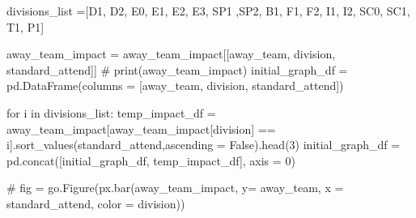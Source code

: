 \documentclass[
  letterpaper,
  DIV=11,
  numbers=noendperiod]{scrartcl}
\newenvironment{Shaded}{\begin{snugshade}}{\end{snugshade}}
\newcommand{\CommentTok}[1]{\textcolor[rgb]{0.37,0.37,0.37}{#1}}
\newcommand{\ControlFlowTok}[1]{\textcolor[rgb]{0.00,0.23,0.31}{#1}}
\newcommand{\DecValTok}[1]{\textcolor[rgb]{0.68,0.00,0.00}{#1}}
\newcommand{\KeywordTok}[1]{\textcolor[rgb]{0.00,0.23,0.31}{#1}}
\newcommand{\NormalTok}[1]{\textcolor[rgb]{0.00,0.23,0.31}{#1}}
\newcommand{\OperatorTok}[1]{\textcolor[rgb]{0.37,0.37,0.37}{#1}}
\newcommand{\StringTok}[1]{\textcolor[rgb]{0.13,0.47,0.30}{#1}}
\newcommand{\VariableTok}[1]{\textcolor[rgb]{0.07,0.07,0.07}{#1}}
\begin{document}
\begin{Shaded}
\begin{Highlighting}[]
\NormalTok{divisions\_list }\OperatorTok{=}\NormalTok{[}\StringTok{\textquotesingle{}D1\textquotesingle{}}\NormalTok{, }\StringTok{\textquotesingle{}D2\textquotesingle{}}\NormalTok{, }\StringTok{\textquotesingle{}E0\textquotesingle{}}\NormalTok{, }\StringTok{\textquotesingle{}E1\textquotesingle{}}\NormalTok{, }\StringTok{\textquotesingle{}E2\textquotesingle{}}\NormalTok{, }\StringTok{\textquotesingle{}E3\textquotesingle{}}\NormalTok{, }\StringTok{\textquotesingle{}SP1\textquotesingle{}}\NormalTok{ ,}\StringTok{\textquotesingle{}SP2\textquotesingle{}}\NormalTok{, }\StringTok{\textquotesingle{}B1\textquotesingle{}}\NormalTok{, }\StringTok{\textquotesingle{}F1\textquotesingle{}}\NormalTok{, }\StringTok{\textquotesingle{}F2\textquotesingle{}}\NormalTok{, }\StringTok{\textquotesingle{}I1\textquotesingle{}}\NormalTok{, }\StringTok{\textquotesingle{}I2\textquotesingle{}}\NormalTok{, }\StringTok{\textquotesingle{}SC0\textquotesingle{}}\NormalTok{, }\StringTok{\textquotesingle{}SC1\textquotesingle{}}\NormalTok{, }\StringTok{\textquotesingle{}T1\textquotesingle{}}\NormalTok{, }\StringTok{\textquotesingle{}P1\textquotesingle{}}\NormalTok{]}

\NormalTok{away\_team\_impact }\OperatorTok{=}\NormalTok{ away\_team\_impact[[}\StringTok{\textquotesingle{}away\_team\textquotesingle{}}\NormalTok{, }\StringTok{\textquotesingle{}division\textquotesingle{}}\NormalTok{, }\StringTok{\textquotesingle{}standard\_attend\textquotesingle{}}\NormalTok{]]}
\CommentTok{\# print(away\_team\_impact)}
\NormalTok{initial\_graph\_df }\OperatorTok{=}\NormalTok{ pd.DataFrame(columns }\OperatorTok{=}\NormalTok{ [}\StringTok{\textquotesingle{}away\_team\textquotesingle{}}\NormalTok{, }\StringTok{\textquotesingle{}division\textquotesingle{}}\NormalTok{, }\StringTok{\textquotesingle{}standard\_attend\textquotesingle{}}\NormalTok{])}

\ControlFlowTok{for}\NormalTok{ i }\KeywordTok{in}\NormalTok{ divisions\_list:}
\NormalTok{        temp\_impact\_df }\OperatorTok{=}\NormalTok{ away\_team\_impact[away\_team\_impact[}\StringTok{\textquotesingle{}division\textquotesingle{}}\NormalTok{] }\OperatorTok{==}\NormalTok{ i].sort\_values(}\StringTok{\textquotesingle{}standard\_attend\textquotesingle{}}\NormalTok{,ascending }\OperatorTok{=} \VariableTok{False}\NormalTok{).head(}\DecValTok{3}\NormalTok{)}
\NormalTok{        initial\_graph\_df }\OperatorTok{=}\NormalTok{ pd.concat([initial\_graph\_df, temp\_impact\_df], axis }\OperatorTok{=} \DecValTok{0}\NormalTok{)}


\CommentTok{\# fig = go.Figure(px.bar(away\_team\_impact, y= \textquotesingle{}away\_team\textquotesingle{}, x = \textquotesingle{}standard\_attend\textquotesingle{}, color = \textquotesingle{}division\textquotesingle{}))}


\end{Highlighting}
\end{Shaded}
\end{document}
